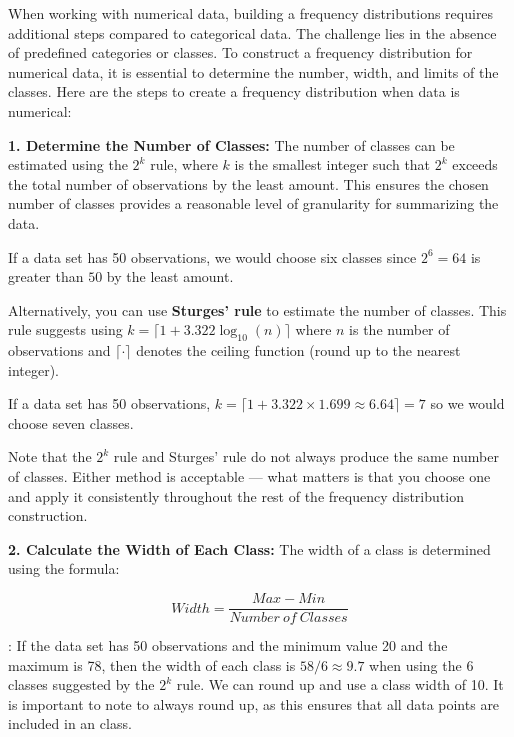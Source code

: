 \documentclass[
  11pt,
  letterpaper,
  DIV=11,
  numbers=noendperiod,
  oneside,
  open=any]{scrreprt}
\begin{document}
When working with numerical data, building a frequency distributions
requires additional steps compared to categorical data. The challenge
lies in the absence of predefined categories or classes. To construct a
frequency distribution for numerical data, it is essential to determine
the number, width, and limits of the classes. Here are the steps to
create a frequency distribution when data is numerical:

\textbf{1. Determine the Number of Classes:} The number of classes can
be estimated using the \(2^k\) rule, where \(k\) is the smallest integer
such that \(2^k\) exceeds the total number of observations by the least
amount. This ensures the chosen number of classes provides a reasonable
level of granularity for summarizing the data.

\begin{bsexample}[Example]

If a data set has 50 observations, we would choose six classes since
\(2^6=64\) is greater than \(50\) by the least amount.

\end{bsexample}

Alternatively, you can use \textbf{Sturges' rule} to estimate the number
of classes. This rule suggests using
\(k = \lceil 1 + 3.322 \log_{10}(n) \rceil\) where \(n\) is the number
of observations and \(\lceil \cdot \rceil\) denotes the ceiling function
(round up to the nearest integer).

\begin{bsexample}[Example]

If a data set has 50 observations,
\(k = \lceil 1 + 3.322 \times 1.699 \approx 6.64 \rceil = 7\) so we
would choose seven classes.

\end{bsexample}

Note that the \(2^k\) rule and Sturges' rule do not always produce the
same number of classes. Either method is acceptable --- what matters is
that you choose one and apply it consistently throughout the rest of the
frequency distribution construction.

\textbf{2. Calculate the Width of Each Class:} The width of a class is
determined using the formula:

\[Width = \frac{Max-Min}{Number\ of\ Classes}\]

\begin{bsexample}[Example]

: If the data set has 50 observations and the minimum value 20 and the
maximum is 78, then the width of each class is \(58/6 \approx 9.7\) when
using the \(6\) classes suggested by the \(2^k\) rule. We can round up
and use a class width of 10. It is important to note to always round up,
as this ensures that all data points are included in an class.

\end{bsexample}
\end{document}

